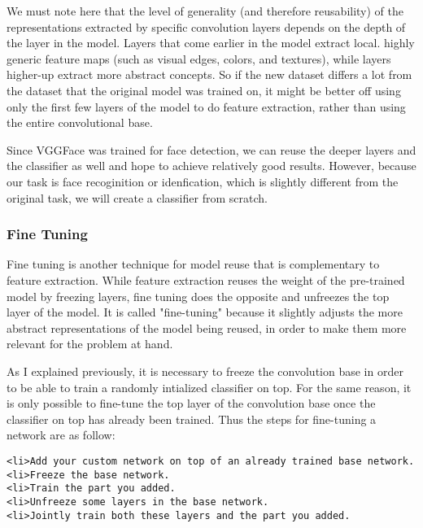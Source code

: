 \documentclass[11pt]{article}
\begin{document}
    We must note here that the level of generality (and therefore
reusability) of the representations extracted by specific convolution
layers depends on the depth of the layer in the model. Layers that come
earlier in the model extract local. highly generic feature maps (such as
visual edges, colors, and textures), while layers higher-up extract more
abstract concepts. So if the new dataset differs a lot from the dataset
that the original model was trained on, it might be better off using
only the first few layers of the model to do feature extraction, rather
than using the entire convolutional base.

Since VGGFace was trained for face detection, we can reuse the deeper
layers and the classifier as well and hope to achieve relatively good
results. However, because our task is face recoginition or idenfication,
which is slightly different from the original task, we will create a
classifier from scratch.

    \subsubsection{Fine Tuning}\label{fine-tuning}

    Fine tuning is another technique for model reuse that is complementary
to feature extraction. While feature extraction reuses the weight of the
pre-trained model by freezing layers, fine tuning does the opposite and
unfreezes the top layer of the model. It is called "fine-tuning" because
it slightly adjusts the more abstract representations of the model being
reused, in order to make them more relevant for the problem at hand.

As I explained previously, it is necessary to freeze the convolution
base in order to be able to train a randomly intialized classifier on
top. For the same reason, it is only possible to fine-tune the top layer
of the convolution base once the classifier on top has already been
trained. Thus the steps for fine-tuning a network are as follow:

\begin{verbatim}
<li>Add your custom network on top of an already trained base network.
<li>Freeze the base network.
<li>Train the part you added.
<li>Unfreeze some layers in the base network.
<li>Jointly train both these layers and the part you added. 
\end{verbatim}
\end{document}
